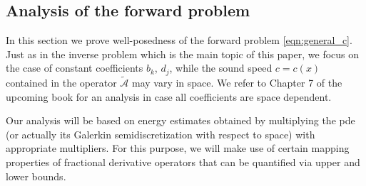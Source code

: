 \def\calAtil{\tilde{\mathcal{A}}}

\subsection{Analysis of the forward problem}

In this section we prove well-posedness of the forward problem \eqref{eqn:general_c}.
Just as in the inverse problem which is the main topic of this paper,
we focus on the case of constant coefficients $b_k$, $d_j$, while the sound speed $c=c(x)$ contained in the operator $\calAtil$ may vary in space. We refer to Chapter 7 of the upcoming book \cite{BBB} for an analysis in case all coefficients are space dependent.

Our analysis will be based on energy estimates obtained by multiplying the {\sc pde} (or actually its Galerkin semidiscretization with respect to space) with appropriate multipliers. For this purpose, we will make use of certain mapping properties of fractional derivative operators that can be quantified via upper and lower bounds.

